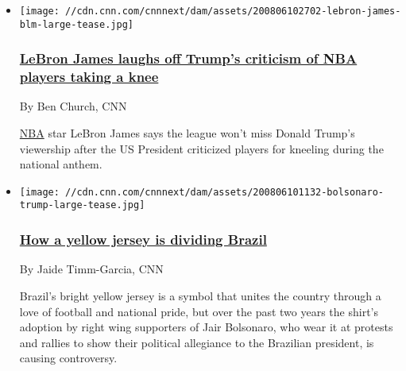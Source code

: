 \begin{itemize}
\item
  \href{/2020/08/06/sport/lebron-james-trump-nba-viewership-spt-intl/index.html}{}

  \texttt{[image: //cdn.cnn.com/cnnnext/dam/assets/200806102702-lebron-james-blm-large-tease.jpg]}

  \hypertarget{lebron-james-laughs-off-trumps-criticism-of-nba-players-taking-a-knee-}{%
  \subsubsection{\texorpdfstring{\href{/2020/08/06/sport/lebron-james-trump-nba-viewership-spt-intl/index.html}{LeBron
  James laughs off Trump's criticism of NBA players taking a knee
  }}{LeBron James laughs off Trump's criticism of NBA players taking a knee }}\label{lebron-james-laughs-off-trumps-criticism-of-nba-players-taking-a-knee-}}

  By Ben Church, CNN

  \href{https://cnn.com/2020/07/30/sport/nba-bubble-disney-world-florida-spt-intl/index.html}{NBA}
  star LeBron James says the league won't miss Donald Trump's viewership
  after the US President criticized players for kneeling during the
  national anthem.
\end{itemize}

\begin{itemize}
\item
  \href{/2020/08/06/football/bolsonaro-brazil-foootball-yellow-shirt-cmd-spt-intl/index.html}{}

  \texttt{[image: //cdn.cnn.com/cnnnext/dam/assets/200806101132-bolsonaro-trump-large-tease.jpg]}

  \hypertarget{how-a-yellow-jersey-is-dividing-brazil}{%
  \subsubsection{\texorpdfstring{\href{/2020/08/06/football/bolsonaro-brazil-foootball-yellow-shirt-cmd-spt-intl/index.html}{How
  a yellow jersey is dividing
  Brazil}}{How a yellow jersey is dividing Brazil}}\label{how-a-yellow-jersey-is-dividing-brazil}}

  By Jaide Timm-Garcia, CNN

  Brazil's bright yellow jersey is a symbol that unites the country
  through a love of football and national pride, but over the past two
  years the shirt's adoption by right wing supporters of Jair Bolsonaro,
  who wear it at protests and rallies to show their political allegiance
  to the Brazilian president, is causing controversy.
\end{itemize}

